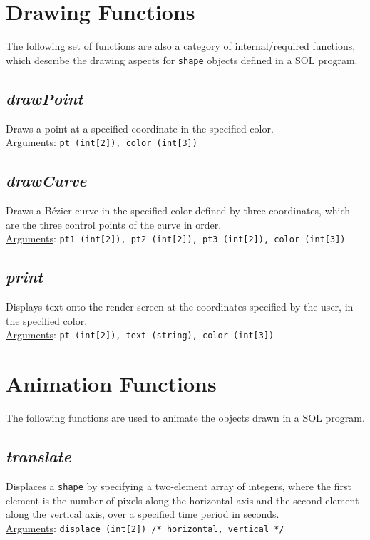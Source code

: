 \documentclass[letterpaper,12pt]{article}
\begin{document}
\section{Drawing Functions}
The following set of functions are also a category of internal/required functions, which describe the drawing aspects for \texttt{shape} objects defined in a SOL program.

\subsection{\textit{drawPoint}}
Draws a point at a specified coordinate in the specified color.\\
\underline{Arguments}: \texttt{pt (int[2]), color (int[3])}

\subsection{\textit{drawCurve}}
Draws a B\'ezier curve in the specified color defined by three coordinates, which are the three control points of the curve in order.\\
\underline{Arguments}: \texttt{pt1 (int[2]), pt2 (int[2]), pt3 (int[2]), color (int[3])}

\subsection{\textit{print}}
Displays text onto the render screen at the coordinates specified by the user, in the specified color.\\
\underline{Arguments}: \texttt{pt (int[2]), text (string), color (int[3])}

\section{Animation Functions} \label{animation}
The following functions are used to animate the objects drawn in a SOL program.

\subsection{\textit{translate}}
Displaces a \texttt{shape} by specifying a two-element array of integers, where the first element is the number of pixels along the horizontal axis and the second element along the vertical axis, over a specified time period in seconds.\\
\underline{Arguments}: \texttt{displace (int[2]) /* horizontal, vertical */}
\end{document}
